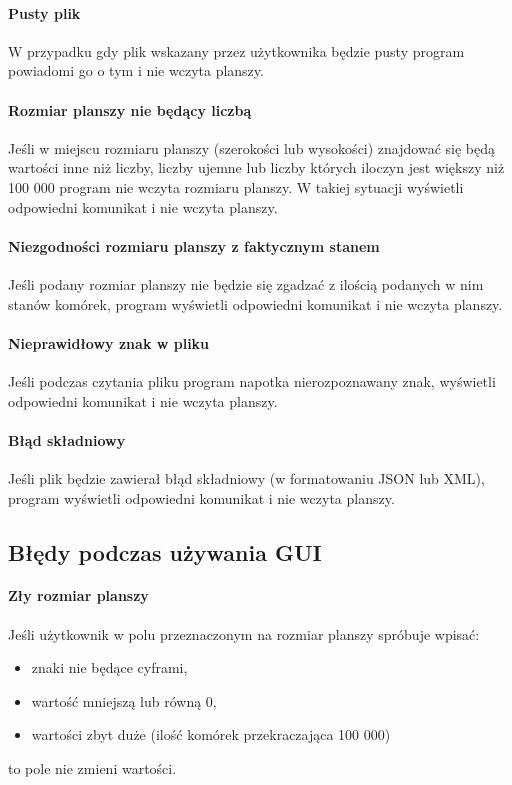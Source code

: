 \documentclass{report}
\begin{document}
\paragraph{Pusty plik}
W przypadku gdy plik wskazany przez użytkownika będzie pusty program powiadomi go o tym i nie wczyta planszy.

\paragraph{Rozmiar planszy nie będący liczbą}
Jeśli w miejscu rozmiaru planszy (szerokości lub wysokości) znajdować się będą wartości inne niż liczby, liczby ujemne lub liczby których iloczyn jest większy niż 100 000 program nie wczyta rozmiaru planszy. W takiej sytuacji wyświetli odpowiedni komunikat i nie wczyta planszy.
 
 \paragraph{Niezgodności rozmiaru planszy z faktycznym stanem}
 Jeśli podany rozmiar planszy nie będzie się zgadzać z ilością podanych w nim stanów komórek, program wyświetli odpowiedni komunikat i nie wczyta planszy.
 
 \paragraph{Nieprawidłowy znak w pliku}
 Jeśli podczas czytania pliku program napotka nierozpoznawany znak, wyświetli odpowiedni komunikat i nie wczyta planszy.
 
 \paragraph{Błąd składniowy}
 Jeśli plik będzie zawierał błąd składniowy (w formatowaniu JSON lub XML), program wyświetli odpowiedni komunikat i nie wczyta planszy.
 
\subsection{Błędy podczas używania GUI}
\paragraph{Zły rozmiar planszy}
Jeśli użytkownik w polu przeznaczonym na rozmiar planszy spróbuje wpisać:
\begin{itemize}
	\item znaki nie będące cyframi,
	\item wartość mniejszą lub równą 0,
	\item wartości zbyt duże (ilość komórek przekraczająca 100 000)
\end{itemize}
to pole nie zmieni wartości.
\end{document}
